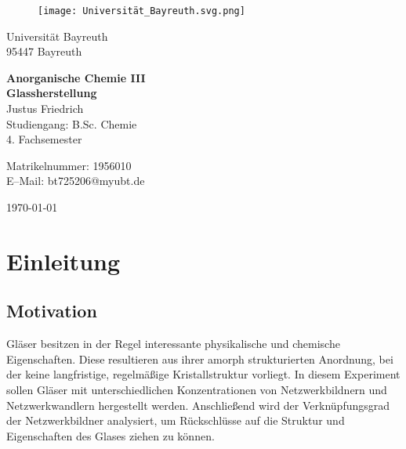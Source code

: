 \documentclass[12pt, a4paper]{article}
\begin{document}
\begin{figure}
    \texttt{[image: Universität\_Bayreuth.svg.png]}
\end{figure}



{\raggedright Universität Bayreuth\\  95447 Bayreuth}


\vspace{5cm}

\begin{center}
{\LARGE\bf{Anorganische Chemie III}} \\  
\vspace{1cm}
{\Large\bf{Glassherstellung}}\\
\vspace{0.5cm}
{\large Justus Friedrich\\}
{Studiengang: B.Sc. Chemie\\}
{4. Fachsemester}
\end{center}





\thispagestyle{empty}
\begin{center}
{\small Matrikelnummer: 1956010 \\
E–Mail:  bt725206@myubt.de}
\end{center}

\vspace{5cm}

\today


\newpage
\tableofcontents
\thispagestyle{empty}


\newpage
\setcounter{page}{1}
\section{Einleitung}



\subsection{Motivation}
Gläser besitzen in der Regel interessante physikalische und chemische Eigenschaften. Diese resultieren aus ihrer amorph strukturierten Anordnung, 
bei der keine langfristige, regelmäßige Kristallstruktur vorliegt. In diesem Experiment sollen Gläser mit unterschiedlichen Konzentrationen von Netzwerkbildnern und Netzwerkwandlern 
hergestellt werden. Anschließend wird der Verknüpfungsgrad der Netzwerkbildner analysiert, um Rückschlüsse auf die Struktur und Eigenschaften des Glases ziehen zu können. \cite{Skript}
\end{document}
